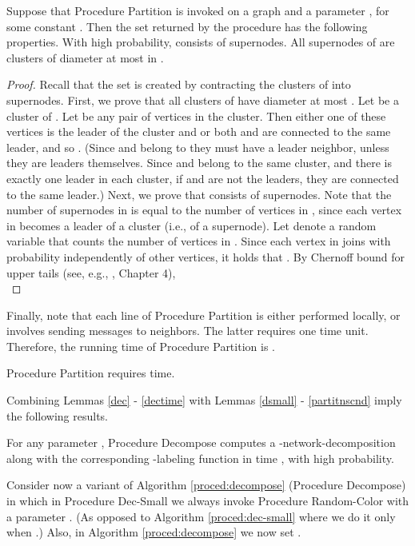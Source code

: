 \documentclass[11pt]{article}
\begin{document}
\begin{lem} \label{partitnscnd}
Suppose that Procedure Partition is invoked on a graph  and a parameter , for some constant . Then the set  returned by the procedure has the following properties. With high probability,  consists of  supernodes. All supernodes of  are clusters of diameter at most  in .
\end{lem}
\begin{proof}
Recall that the set  is created by contracting the clusters of  into supernodes. First, we prove that all clusters of  have diameter at most . Let  be a cluster of . Let  be any pair of vertices in the cluster. Then either one of these vertices is the leader of the cluster and  or both  and  are connected to the same leader, and so . (Since  and  belong to  they must have a leader neighbor, unless they are leaders themselves. Since  and  belong to the same cluster, and there is exactly one leader in each cluster, if  and  are not the leaders, they are connected to the same leader.) Next, we prove that  consists of  supernodes. Note that the number of supernodes in  is equal to the number of vertices in , since each vertex in  becomes a leader of a cluster (i.e., of a supernode). Let  denote a random variable that counts the number of vertices in . Since each vertex in  joins  with probability  independently of other vertices, it holds that . By Chernoff bound for upper tails (see, e.g., \cite{MU05}, Chapter 4),\\

\end{proof}
Finally, note that each line of Procedure Partition is either performed locally, or involves  sending messages to neighbors. The latter requires one time unit. Therefore, the running time of Procedure Partition is .
\begin{lem} \label{prptimecns}
Procedure Partition requires  time.
\end{lem}
Combining Lemmas \ref {dec} - \ref{dectime} with Lemmas \ref{dsmall} - \ref{partitnscnd} imply the following results.
\begin{thm} For any parameter , Procedure Decompose computes a -network-decomposition along with the corresponding -labeling function in time , with high probability.
\end{thm}
Consider now a variant of Algorithm \ref{proced:decompose} (Procedure Decompose) in which in Procedure Dec-Small we always invoke Procedure Random-Color with a parameter . (As opposed to Algorithm \ref{proced:dec-small} where we do it only when .) Also, in Algorithm \ref{proced:decompose} we now set .
\end{document}
